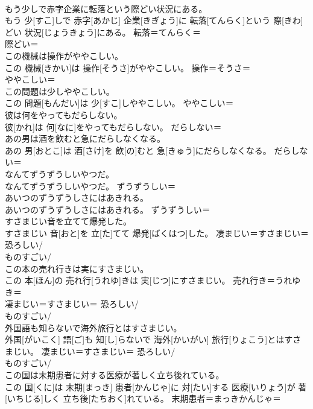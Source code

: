 \documentclass[8pt]{extreport}
\begin{document}
\begin{CJK}{UTF8}{min}
\\	もう少しで赤字企業に転落という際どい状況にある。	
\\	もう 少[すこ]しで 赤字[あかじ] 企業[きぎょう]に 転落[てんらく]という 際[きわ]どい 状況[じょうきょう]にある。	転落＝てんらく＝ 
\\	際どい＝ 
\\	この機械は操作がややこしい。	
\\	この 機械[きかい]は 操作[そうさ]がややこしい。	操作＝そうさ＝ 
\\	ややこしい＝ 
\\	この問題は少しややこしい。	
\\	この 問題[もんだい]は 少[すこ]しややこしい。	ややこしい＝ 
\\	彼は何をやってもだらしない。	
\\	彼[かれ]は 何[なに]をやってもだらしない。	だらしない＝ 
\\	あの男は酒を飲むと急にだらしなくなる。	
\\	あの 男[おとこ]は 酒[さけ]を 飲[の]むと 急[きゅう]にだらしなくなる。	だらしない＝ 
\\	なんてずうずうしいやつだ。	
\\	なんてずうずうしいやつだ。	ずうずうしい＝ 
\\	あいつのずうずうしさにはあきれる。	
\\	あいつのずうずうしさにはあきれる。	ずうずうしい＝ 
\\	すさまじい音を立てて爆発した。	
\\	すさまじい 音[おと]を 立[た]てて 爆発[ばくはつ]した。	凄まじい＝すさまじい＝ 恐ろしい/
\\	ものすごい/
\\	この本の売れ行きは実にすさまじい。	
\\	この 本[ほん]の 売れ行[うれゆ]きは 実[じつ]にすさまじい。	売れ行き＝うれゆき＝ 
\\	凄まじい＝すさまじい＝ 恐ろしい/
\\	ものすごい/
\\	外国語も知らないで海外旅行とはすさまじい。	
\\	外国[がいこく] 語[ご]も 知[し]らないで 海外[かいがい] 旅行[りょこう]とはすさまじい。	凄まじい＝すさまじい＝ 恐ろしい/
\\	ものすごい/
\\	この国は末期患者に対する医療が著しく立ち後れている。	
\\	この 国[くに]は 末期[まっき] 患者[かんじゃ]に 対[たい]する 医療[いりょう]が 著[いちじる]しく 立ち後[たちおく]れている。	末期患者＝まっきかんじゃ＝ 

\end{CJK}
\end{document}
